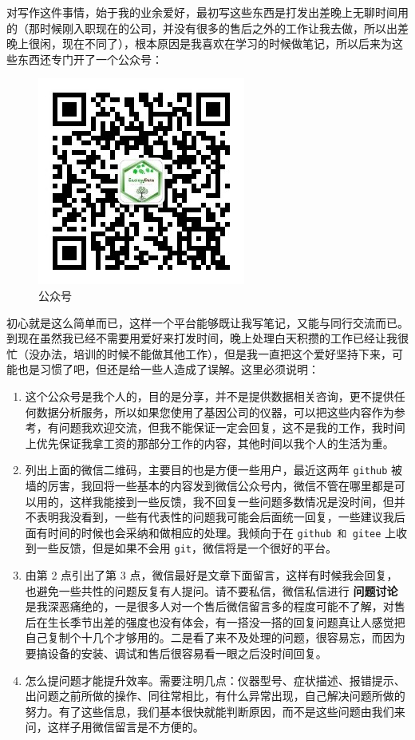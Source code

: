 \documentclass[
  letterpaper,
  DIV=11]{scrreport}
\begin{document}
对写作这件事情，始于我的业余爱好，最初写这些东西是打发出差晚上无聊时间用的（那时候刚入职现在的公司，并没有很多的售后之外的工作让我去做，所以出差晚上很闲，现在不同了），根本原因是我喜欢在学习的时候做笔记，所以后来为这些东西还专门开了一个公众号：

\begin{figure}

{\centering \includegraphics{././img/wechat.png}

}

\caption{公众号}

\end{figure}

初心就是这么简单而已，这样一个平台能够既让我写笔记，又能与同行交流而已。到现在虽然我已经不需要用爱好来打发时间，晚上处理白天积攒的工作已经让我很忙（没办法，培训的时候不能做其他工作），但是我一直把这个爱好坚持下来，可能也是习惯了吧，但还是给一些人造成了误解。这里必须说明：

\begin{enumerate}
\def\labelenumi{\arabic{enumi}.}
\item
  这个公众号是我个人的，目的是分享，并不是提供数据相关咨询，更不提供任何数据分析服务，所以如果您使用了基因公司的仪器，可以把这些内容作为参考，有问题我欢迎交流，但我不能保证一定会回复，这不是我的工作，我时间上优先保证我拿工资的那部分工作的内容，其他时间以我个人的生活为重。
\item
  列出上面的微信二维码，主要目的也是方便一些用户，最近这两年
  \texttt{github}
  被墙的厉害，我回将一些基本的内容发到微信公众号内，微信不管在哪里都是可以用的，这样我能接到一些反馈，我不回复一些问题多数情况是没时间，但并不表明我没看到，一些有代表性的问题我可能会后面统一回复，一些建议我后面有时间的时候也会采纳和做相应的处理。我倾向于在
  \texttt{github\ 和\ gitee} 上收到一些反馈，但是如果不会用
  \texttt{git}，微信将是一个很好的平台。
\item
  由第 2 点引出了第 3
  点，微信最好是文章下面留言，这样有时候我会回复，也避免一些共性的问题反复有人提问。请不要私信，微信私信进行
  \textbf{问题讨论}
  是我深恶痛绝的，一是很多人对一个售后微信留言多的程度可能不了解，对售后在生长季节出差的强度也没有体会，有一搭没一搭的回复问题真让人感觉把自己复制个十几个才够用的。二是看了来不及处理的问题，很容易忘，而因为要搞设备的安装、调试和售后很容易看一眼之后没时间回复。
\item
  怎么提问题才能提升效率。需要注明几点：仪器型号、症状描述、报错提示、出问题之前所做的操作、同往常相比，有什么异常出现，自己解决问题所做的努力。有了这些信息，我们基本很快就能判断原因，而不是这些问题由我们来问，这样子用微信留言是不方便的。
\end{enumerate}
\end{document}

